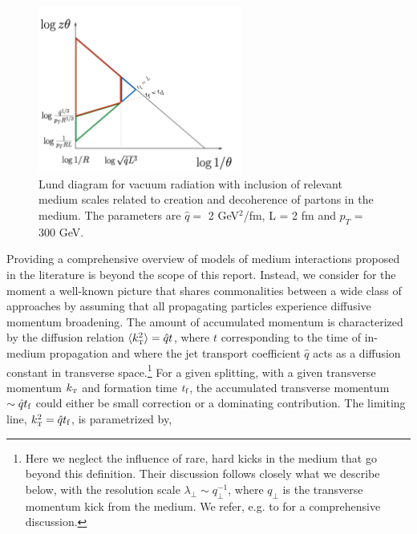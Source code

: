 \begin{figure}
\centering
\includegraphics[width=0.6\textwidth]{figures/kinematics/lund_regions_colored}%
\caption{Lund diagram for vacuum radiation with inclusion of relevant medium scales related to creation and decoherence of partons in the medium. The parameters are $\hat q = $ 2 GeV$^2$/fm, L = 2 fm and $p_{\scriptscriptstyle T}$ = 300 GeV. 
}
\label{fig:PS1}
\end{figure}
Providing a comprehensive overview of models of medium interactions proposed in the literature is beyond the scope of this report. Instead, we consider for the moment a well-known picture that shares commonalities between a wide class of approaches by assuming that all propagating particles experience diffusive momentum broadening. The amount of accumulated momentum is characterized by the diffusion relation $\langle k_{\text{\tiny T}}^2 \rangle = \hat q t$, where $t$ corresponding to the time of in-medium propagation and where the jet transport coefficient $\hat q$ acts as a diffusion constant in transverse space.\footnote{Here we neglect the influence of rare, hard kicks in the medium that go beyond this definition. Their discussion follows closely what we describe below, with the resolution scale $\lambda_\perp \sim q_\perp^{-1}$, where $q_\perp$ is the transverse momentum kick from the medium. We refer, e.g. to \cite{Kurkela:2014tla} for a comprehensive discussion.} 
For a given splitting, with a given transverse momentum $k_{\text{\tiny T}}$ and formation time $t_\text{f}$, the accumulated transverse momentum $\sim \hat q t_\text{f}$ could either be small correction or a dominating contribution. The limiting line, $k_{\text{\tiny T}}^2 = \hat q t_\text{f}$, is parametrized by,
